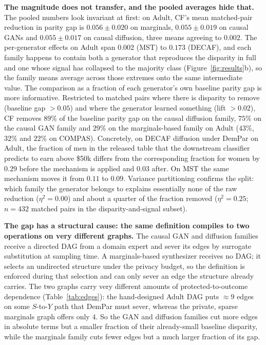 \documentclass{article}
\begin{document}
\textbf{The magnitude does not transfer, and the pooled averages hide that.}
The pooled numbers look invariant at first: on Adult, CF's mean matched-pair
reduction in parity gap is $0.056 \pm 0.020$ on marginals, $0.055 \pm 0.019$
on causal GANs and $0.055 \pm 0.017$ on causal diffusion, three means
agreeing to $0.002$. The per-generator effects on Adult span $0.002$ (MST)
to $0.173$ (DECAF), and each family happens to contain both a generator
that reproduces the disparity in full and one whose signal has collapsed to
the majority class (Figure~\ref{fig:results}b), so the family means average
across those extremes onto the same intermediate value. The comparison as a fraction of
each generator's own baseline parity gap is more informative. Restricted to
matched pairs where there is disparity to remove (baseline gap $>0.05$) and
where the generator learned something (lift $>0.02$), CF removes $89\%$ of
the baseline parity gap on the causal diffusion family, $75\%$ on the causal
GAN family and $29\%$ on the marginals-based family on Adult ($43\%$, $32\%$
and $22\%$ on COMPAS). Concretely, on DECAF
diffusion under DemPar on Adult, the fraction of men in the released table
that the downstream classifier predicts to earn above \$50k differs from the
corresponding fraction for women by $0.29$ before the mechanism is applied
and $0.03$ after. On MST the same mechanism moves it from $0.11$ to $0.09$.
Variance partitioning confirms the split: which family the generator belongs
to explains essentially none of the raw reduction ($\eta^2 = 0.00$) and
about a quarter of the fraction removed ($\eta^2 = 0.25$; $n = 432$ matched
pairs in the disparity-and-signal subset).

\textbf{The gap has a structural cause: the same definition compiles to two
operations on very different graphs.} The causal GAN and diffusion families
receive a directed DAG from a domain expert and sever its edges by surrogate
substitution at sampling time. A marginals-based synthesizer receives no DAG;
it selects an undirected structure under the privacy budget, so the definition
is enforced during that selection and can only sever an edge the structure
already carries. The two graphs carry very different amounts of
protected-to-outcome dependence (Table~\ref{tab:edges}): the hand-designed
Adult DAG puts $\approx 9$ edges on some $S$-to-$Y$ path that DemPar must
sever, whereas the private, sparse marginals graph offers only $4$. So the GAN
and diffusion families cut more edges in absolute terms but a smaller fraction
of their already-small baseline disparity, while the marginals family cuts
fewer edges but a much larger fraction of its gap.
\end{document}
